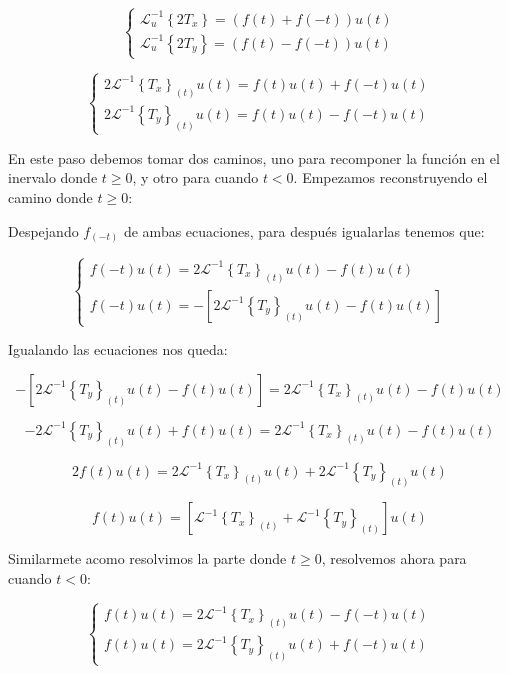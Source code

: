 \documentclass[12pt]{article}
\begin{document}
$$
\begin{cases}
\mathcal{L}_u^{-1}\left\{2 T_x\right\} =(f(t) + f(-t)) u(t)\\[0.2 cm]
\mathcal{L}_u^{-1}\left\{2 T_y\right\} =  (f(t) -f(-t)) u(t)
\end{cases}
$$

$$
\begin{cases}
2 \mathcal{L}^{-1}\left\{ T_x\right\}_{(t)} u(t)=f(t)u(t) + f(-t)u(t)\\[0.2 cm]
2 \mathcal{L}^{-1}\left\{T_y\right\}_{(t)} u(t)=f(t)u(t) -f(-t)u(t)
\end{cases}
$$

En este paso debemos tomar dos caminos, uno para recomponer la función en el inervalo donde $t\ge 0$, y otro para cuando $t<0$. Empezamos reconstruyendo el camino donde $t \ge 0$:

Despejando $f_{(-t)}$ de ambas ecuaciones, para después igualarlas tenemos que:

$$
\begin{cases}
f(-t)u(t) = 2 \mathcal{L}^{-1}\left\{ T_x\right\}_{(t)} u(t) - f(t)u(t)\\
f(-t)u(t) = -\left[2 \mathcal{L}^{-1}\left\{T_y\right\}_{(t)} u(t) - f(t)u(t)\right]
\end{cases}
$$

Igualando las ecuaciones nos queda:

$$
-\left[2 \mathcal{L}^{-1}\left\{T_y\right\}_{(t)} u(t) - f(t)u(t)\right] = 2 \mathcal{L}^{-1}\left\{ T_x\right\}_{(t)} u(t) - f(t)u(t)
$$

$$
-2 \mathcal{L}^{-1}\left\{T_y\right\}_{(t)} u(t) + f(t)u(t) = 2 \mathcal{L}^{-1}\left\{ T_x\right\}_{(t)} u(t) - f(t)u(t)  
$$

$$
2 f(t)u(t) = 2 \mathcal{L}^{-1}\left\{ T_x\right\}_{(t)} u(t) + 2 \mathcal{L}^{-1}\left\{T_y\right\}_{(t)} u(t) 
$$

\begin{equation}
f(t)u(t) = \left[ \mathcal{L}^{-1}\left\{ T_x\right\}_{(t)}+ \mathcal{L}^{-1}\left\{T_y\right\}_{(t)}\right]  u(t)
\label{parte_positiva}
\end{equation}

Similarmete acomo resolvimos la parte donde $t \ge 0$, resolvemos ahora para cuando $ t < 0$:

$$
\begin{cases}
f(t)u(t) = 2 \mathcal{L}^{-1}\left\{T_x\right\}_{(t)} u(t) - f(-t)u(t)\\
f(t)u(t) = 2 \mathcal{L}^{-1}\left\{T_y\right\}_{(t)} u(t) + f(-t)u(t)
\end{cases}
$$
\end{document}
